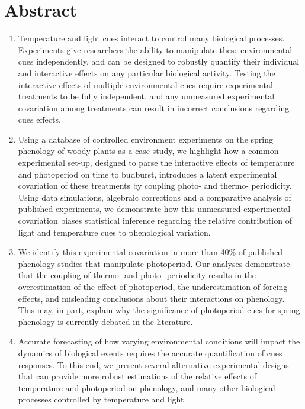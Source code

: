 \documentclass[11pt]{article}
\begin{document}
\section*{Abstract}
\begin{enumerate}
\item Temperature and light cues interact to control many biological processes. Experiments give researchers the ability to manipulate these environmental cues independently, and can be designed to robustly quantify their individual and interactive effects on any particular biological activity. Testing the interactive effects of multiple environmental cues require experimental treatments to be fully independent, and any unmeasured experimental covariation among treatments can result in incorrect conclusions regarding cues effects. 

\item  Using a database of controlled environment experiments on the spring phenology of woody plants as a case study, we highlight how a common experimental set-up, designed to parse the interactive effects of temperature and photoperiod on time to budburst, introduces a latent experimental covariation of these treatments by coupling photo- and thermo- periodicity. Using data simulations, algebraic corrections and a comparative analysis of published experiments, we demonstrate how this unmeasured experimental covariation biases statistical inference regarding the relative contribution of light and temperature cues to phenological variation.

\item We identify this experimental covariation in more than 40\% of published phenology studies that manipulate photoperiod. Our analyses demonstrate that the coupling of thermo- and photo- periodicity results in the overestimation of the effect of photoperiod, the underestimation of forcing effects, and misleading conclusions about their interactions on phenology. This may, in part, explain why the significance of photoperiod cues for spring phenology is currently debated in the literature.

\item Accurate forecasting of how varying environmental conditions will impact the dynamics of biological events requires the accurate quantification of cues responses. To this end, we present several alternative experimental designs that can provide more robust estimations of the relative effects of temperature and photoperiod on phenology, and many other biological processes controlled by temperature and light.
\end{enumerate}
\end{document}
